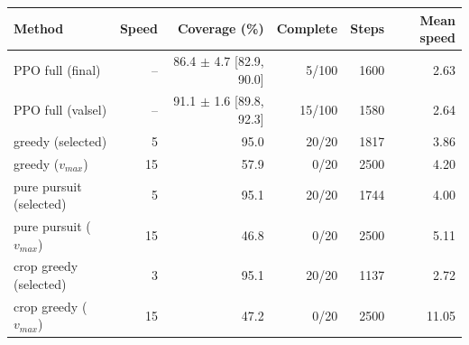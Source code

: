 \begin{tabular}{lrrrrr}
\toprule
Method & Speed & Coverage (\%) & Complete & Steps & Mean speed \\
\midrule
PPO full (final) & -- & 86.4 $\pm$ 4.7 [82.9, 90.0] & 5/100 & 1600 & 2.63 \\
PPO full (valsel) & -- & 91.1 $\pm$ 1.6 [89.8, 92.3] & 15/100 & 1580 & 2.64 \\
\midrule
greedy (selected) & 5 & 95.0 & 20/20 & 1817 & 3.86 \\
greedy ($v_{max}$) & 15 & 57.9 & 0/20 & 2500 & 4.20 \\
pure pursuit (selected) & 5 & 95.1 & 20/20 & 1744 & 4.00 \\
pure pursuit ($v_{max}$) & 15 & 46.8 & 0/20 & 2500 & 5.11 \\
crop greedy (selected) & 3 & 95.1 & 20/20 & 1137 & 2.72 \\
crop greedy ($v_{max}$) & 15 & 47.2 & 0/20 & 2500 & 11.05 \\
\bottomrule
\end{tabular}
